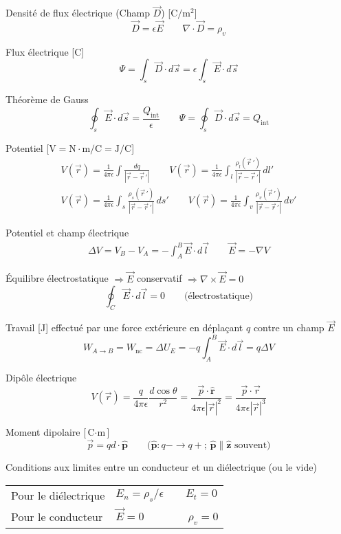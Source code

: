 \documentclass[10pt,landscape]{article}
\newcommand{\halfline}{\vspace{0.5em}}
\newcommand{\tableindent}{\hspace{1.5em}}
\newcommand{\uvec}[1]{\ensuremath{\boldsymbol{\hat{#1}}}}
\begin{document}
\begin{multicols}{3}
Densité de flux électrique (Champ $\vec{D}$)  [$\si{\coulomb/\metre^2}$]
\[ \vec{D} = \epsilon\vec{E}
\qquad \nabla \cdot \vec{D} = \rho_v \]

Flux électrique [\si{\coulomb}]
\[  \Psi = \int_{s} \vec{D} \cdot d\vec{s} = \epsilon \int_{s} \vec{E} \cdot d\vec{s} \]

Théorème de Gauss
\[ \oint_s \vec{E}\cdot d\vec{s} = \frac{Q_\text{int}}{\epsilon}
\qquad  \Psi = \oint_s \vec{D}\cdot d\vec{s} = Q_\text{int} \]

Potentiel [$\si{\volt} = \si{\newton\cdot\metre/\coulomb} = \si{\joule/\coulomb}$]
\begin{gather*}
V(\vec{r}) = \frac{1}{4\pi\epsilon} \int \frac{dq}{| \vec{r} - \vec{r}\,' | }  \qquad
V(\vec{r}) = \frac{1}{4\pi\epsilon} \int_{l} \frac{\rho_l(\vec{r}\,')}{| \vec{r} - \vec{r}\,' | } \,dl'  \\
V(\vec{r}) = \frac{1}{4\pi\epsilon} \int_{s} \frac{\rho_s(\vec{r}\,')}{| \vec{r} - \vec{r}\,'| } \,ds'  \qquad
V(\vec{r}) = \frac{1}{4\pi\epsilon} \int_{v} \frac{\rho_v(\vec{r}\,')}{| \vec{r} - \vec{r}\,' | } \,dv'  
\end{gather*}

Potentiel et champ électrique
\begin{gather*}
\Delta V = V_B - V_A  = -\int_A^B \vec{E}\cdot d\vec{l} \qquad
 \vec{E} = -\nabla V
\end{gather*}

Équilibre électrostatique $\Rightarrow \vec{E}$ conservatif  $\Rightarrow \nabla \times \vec{E} = 0$
\[  \oint_C \vec{E}\cdot d\vec{l}  = 0 \qquad \text{(électrostatique)}\]

Travail [\si{\joule}] effectué par une force extérieure en déplaçant $q$ contre un champ $\vec{E}$
\[ W_{A\to B} = W_\text{nc} = \Delta U_E = -q\int_{A}^{B} \vec{E}\cdot d\vec{l} = q\Delta V \]

Dipôle électrique
\[ V(\vec{r}) = \frac{q}{4\pi\epsilon} \frac{d\cos\theta}{r^2} =
\frac{\vec{p}\cdot\uvec{r}}{4\pi\epsilon|\vec{r}|^2} =
\frac{\vec{p}\cdot\vec{r}}{4\pi\epsilon|\vec{r}|^3} \]

Moment dipolaire [$\si{\coulomb\cdot\meter}$]
\[ \vec{p} = qd\cdot \uvec{p} \qquad \text{($\uvec{p}: q- \to q+$;  $\uvec{p}\parallel\uvec{z}$ souvent)} \]

\halfline
Conditions aux limites entre un conducteur et un diélectrique  (ou le vide)\\
\halfline
\begin{tabular}{@{\tableindent}ll@{}}
	Pour le diélectrique & $ E_n = {\rho_s}/{\epsilon} \qquad E_t = 0 $ \\
	Pour le conducteur  & $\vec{E} = 0 \qquad\qquad \rho_v = 0 $ \\
\end{tabular}


\end{multicols}
\end{document}
